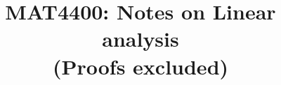 \documentclass{article}
\theoremstyle{definition}
\newif\ifdetailed
\begin{document}
\ifdetailed
  \title{MAT4400: Detailed Notes on Linear analysis }
\else
  \title{MAT4400: Notes on Linear analysis \protect\\ (Proofs excluded)}
\fi
\maketitle

\begin{multicols}{2}
  
  
  \setcounter{section}{2}
  \setcounter{theorem}{2}
  
  \setcounter{section}{3}
  \setcounter{theorem}{3}

  
  
  
  
  
  
  
  
  
  
  
  
  
\end{multicols}



\end{document}
